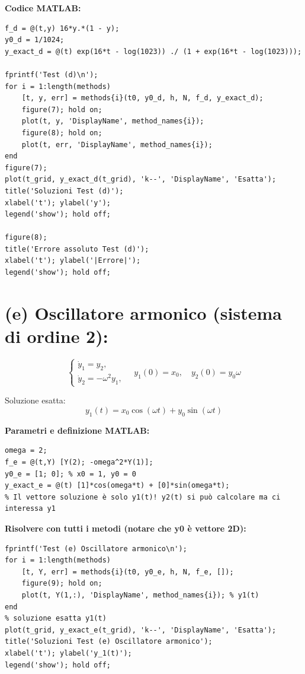\documentclass[12pt,a4paper]{article}
\begin{document}
\noindent
\textbf{Codice MATLAB:}
\begin{lstlisting}
f_d = @(t,y) 16*y.*(1 - y);
y0_d = 1/1024;
y_exact_d = @(t) exp(16*t - log(1023)) ./ (1 + exp(16*t - log(1023)));

fprintf('Test (d)\n');
for i = 1:length(methods)
    [t, y, err] = methods{i}(t0, y0_d, h, N, f_d, y_exact_d);
    figure(7); hold on;
    plot(t, y, 'DisplayName', method_names{i});
    figure(8); hold on;
    plot(t, err, 'DisplayName', method_names{i});
end
figure(7);
plot(t_grid, y_exact_d(t_grid), 'k--', 'DisplayName', 'Esatta');
title('Soluzioni Test (d)');
xlabel('t'); ylabel('y');
legend('show'); hold off;

figure(8);
title('Errore assoluto Test (d)');
xlabel('t'); ylabel('|Errore|');
legend('show'); hold off;
\end{lstlisting}

\newpage
\section*{(e) Oscillatore armonico (sistema di ordine 2):}  
\[
\begin{cases}
\dot{y}_1 = y_2, \\
\dot{y}_2 = -\omega^2 y_1,
\end{cases}
\quad y_1(0) = x_0, \quad y_2(0) = y_0 \omega
\]

Soluzione esatta:  
\[
y_1(t) = x_0 \cos(\omega t) + y_0 \sin(\omega t)
\]

\noindent
\textbf{Parametri e definizione MATLAB:}
\begin{lstlisting}
omega = 2;
f_e = @(t,Y) [Y(2); -omega^2*Y(1)];
y0_e = [1; 0]; % x0 = 1, y0 = 0
y_exact_e = @(t) [1]*cos(omega*t) + [0]*sin(omega*t);
% Il vettore soluzione è solo y1(t)! y2(t) si può calcolare ma ci interessa y1
\end{lstlisting}

\vspace{1em}

\noindent
\textbf{Risolvere con tutti i metodi (notare che y0 è vettore 2D):}
\begin{lstlisting}
fprintf('Test (e) Oscillatore armonico\n');
for i = 1:length(methods)
    [t, Y, err] = methods{i}(t0, y0_e, h, N, f_e, []);
    figure(9); hold on;
    plot(t, Y(1,:), 'DisplayName', method_names{i}); % y1(t)
end
% soluzione esatta y1(t)
plot(t_grid, y_exact_e(t_grid), 'k--', 'DisplayName', 'Esatta');
title('Soluzioni Test (e) Oscillatore armonico');
xlabel('t'); ylabel('y_1(t)');
legend('show'); hold off;
\end{lstlisting}
\end{document}
